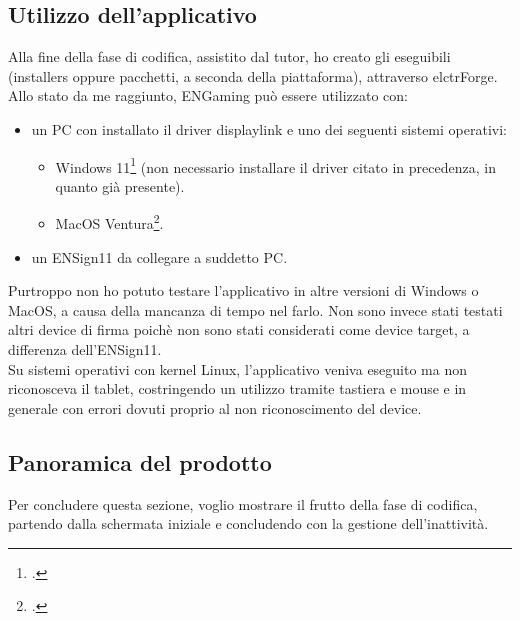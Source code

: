 \newpage
\subsection{Utilizzo dell'applicativo}
Alla fine della fase di codifica, assistito dal tutor, ho creato gli eseguibili (installers oppure pacchetti, a seconda della piattaforma), attraverso \Gls{elctrForge}.\\
Allo stato da me raggiunto, ENGaming può essere utilizzato con:
\begin{itemize}
    \item un PC con installato il driver \gls{displaylink} e uno dei seguenti sistemi operativi: \begin{itemize}
    \item Windows 11\footcite{site:w11} (non necessario installare il driver citato in precedenza, in quanto già presente).
    \item MacOS Ventura\footcite{site:macosVentura}.
    \end{itemize}
    \item un ENSign11 da collegare a suddetto PC.
\end{itemize}
Purtroppo non ho potuto testare l'applicativo in altre versioni di Windows o MacOS, a causa della mancanza di tempo nel farlo. Non sono invece stati testati altri device di firma poichè non sono stati considerati come device target, a differenza dell'ENSign11.\\
Su sistemi operativi con kernel Linux, l'applicativo veniva eseguito ma non riconosceva il tablet, costringendo un utilizzo tramite tastiera e mouse e in generale con errori dovuti proprio al non riconoscimento del device.
\newpage
\subsection{Panoramica del prodotto}
\label{subsec:panoramicaProdotto}
Per concludere questa sezione, voglio mostrare il frutto della fase di codifica, partendo dalla schermata iniziale e concludendo con la gestione dell'inattività.\\
